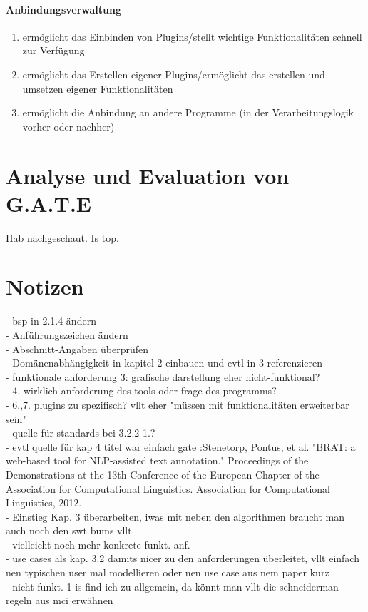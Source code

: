 \documentclass[12pt]{report}
\begin{document}
\subsubsection{Anbindungsverwaltung}
\begin{enumerate}
\item ermöglicht das Einbinden von Plugins/stellt wichtige Funktionalitäten schnell zur Verfügung
\item ermöglicht das Erstellen eigener Plugins/ermöglicht das erstellen und umsetzen eigener Funktionalitäten
\item ermöglicht die Anbindung an andere Programme (in der Verarbeitungslogik vorher oder nachher)
\end{enumerate}

\chapter{Analyse und Evaluation von G.A.T.E}
Hab nachgeschaut. Is top.

\chapter{Notizen}
- bsp in 2.1.4 ändern\\
- Anführungszeichen ändern\\
- Abschnitt-Angaben überprüfen\\
- Domänenabhängigkeit in kapitel 2 einbauen und evtl in 3 referenzieren\\
- funktionale anforderung 3: grafische darstellung eher nicht-funktional?\\
- 4. wirklich anforderung des tools oder frage des programms?\\
- 6.,7. plugins zu spezifisch? vllt eher "müssen mit funktionalitäten erweiterbar sein"\\
- quelle für standards bei 3.2.2 1.?\\
- evtl quelle für kap 4 titel war einfach gate :Stenetorp, Pontus, et al. "BRAT: a web-based tool for NLP-assisted text annotation." Proceedings of the Demonstrations at the 13th Conference of the European Chapter of the Association for Computational Linguistics. Association for Computational Linguistics, 2012.\\
- Einstieg Kap. 3 überarbeiten, iwas mit neben den algorithmen braucht man auch noch den swt bums vllt\\
- vielleicht noch mehr konkrete funkt. anf.\\
- use cases als kap. 3.2 damits nicer zu den anforderungen überleitet, vllt einfach nen typischen user mal modellieren oder nen use case aus nem paper kurz\\
- nicht funkt. 1 is find ich zu allgemein, da könnt man vllt die schneiderman regeln aus mci erwähnen\\
 
\end{document}

